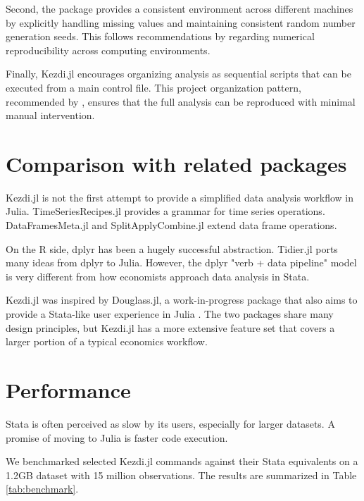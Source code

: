\documentclass{juliacon}
\begin{document}
Second, the package provides a consistent environment across different machines by explicitly handling missing values and maintaining consistent random number generation seeds. This follows recommendations by \cite{mccullough1999numerical} regarding numerical reproducibility across computing environments.

Finally, Kezdi.jl encourages organizing analysis as sequential scripts that can be executed from a main control file. This project organization pattern, recommended by \cite{koren2024ten}, ensures that the full analysis can be reproduced with minimal manual intervention.

\section{Comparison with related packages}

Kezdi.jl is not the first attempt to provide a simplified data analysis workflow in Julia. TimeSeriesRecipes.jl \cite{TimeSeriesRecipes2022} provides a grammar for time series operations. DataFramesMeta.jl \cite{DataFramesMeta2023} and SplitApplyCombine.jl \cite{SplitApplyCombine2023} extend data frame operations.

On the R side, dplyr \cite{dplyr2023} has been a hugely successful abstraction. Tidier.jl \cite{tidier2022} ports many ideas from dplyr to Julia. However, the dplyr "verb + data pipeline" model is very different from how economists approach data analysis in Stata.

Kezdi.jl was inspired by Douglass.jl, a work-in-progress package that also aims to provide a Stata-like user experience in Julia \cite{Douglass.jl2023}. The two packages share many design principles, but Kezdi.jl has a more extensive feature set that covers a larger portion of a typical economics workflow.

\section{Performance}

Stata is often perceived as slow by its users, especially for larger datasets. A promise of moving to Julia is faster code execution.

We benchmarked selected Kezdi.jl commands against their Stata equivalents on a 1.2GB dataset with 15 million observations. The results are summarized in Table \ref{tab:benchmark}.
\end{document}
